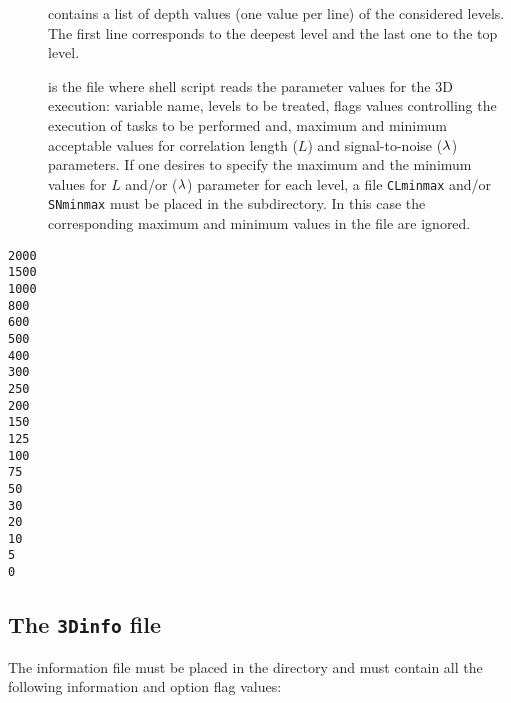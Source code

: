 \begin{description}

\item[] contains a list of depth values (one value per line) of the considered levels. The first line corresponds to the deepest level and the last one to the top level. 

\item[] is the file where shell script reads the parameter values for the 3D execution: variable name, levels to be treated, flags values controlling the execution of tasks to be performed and, maximum and minimum acceptable values for correlation length ($L$) and signal-to-noise ($\lambda$) parameters. If one desires to specify the maximum and the minimum values for $L$  and/or ($\lambda$) parameter for each level, a file \texttt{CLminmax} and/or \texttt{SNminmax} must be placed in the  subdirectory. In this case the corresponding maximum and minimum values in the  file are ignored.
\end{description}

\begin{center}
\begin{exfile}[H] %
\begin{footnotesize}
\begin{verbatim}
2000
1500
1000
800
600
500
400
300
250
200
150
125
100
75
50
30
20
10
5
0
\end{verbatim}
\end{footnotesize}
\caption{}
\label{contdepthfile}
\end{exfile}

\end{center}




\subsection{The \texttt{3Dinfo} file \label{sec:3Dinfo}}

The information file  must be placed in the  directory and must contain all the following information and option flag values:

